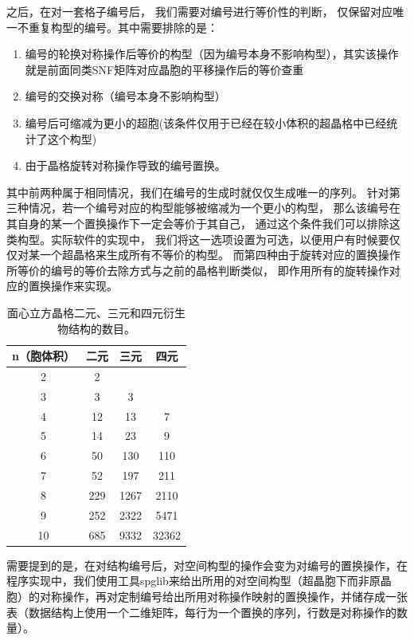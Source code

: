 之后，在对一套格子编号后，
我们需要对编号进行等价性的判断，
仅保留对应唯一不重复构型的编号。其中需要排除的是：
\begin{enumerate}
  \item 编号的轮换对称操作后等价的构型（因为编号本身不影响构型），其实该操作就是前面同类SNF矩阵对应晶胞的平移操作后的等价查重
  \item 编号的交换对称（编号本身不影响构型）
  \item 编号后可缩减为更小的超胞(该条件仅用于已经在较小体积的超晶格中已经统计了这个构型)
  \item 由于晶格旋转对称操作导致的编号置换。
\end{enumerate}
其中前两种属于相同情况，我们在编号的生成时就仅仅生成唯一的序列。
针对第三种情况，若一个编号对应的构型能够被缩减为一个更小的构型，
那么该编号在其自身的某一个置换操作下一定会等价于其自己，
通过这个条件我们可以排除这类构型。实际软件的实现中，
我们将这一选项设置为可选，以便用户有时候要仅仅对某一个超晶格来生成所有不等价的构型。
而第四种由于旋转对应的置换操作所等价的编号的等价去除方式与之前的晶格判断类似，
即作用所有的旋转操作对应的置换操作来实现。

\begin{table}[htb!]
  \centering
  \begin{tabular}{cccc}
    \hline\hline
    n（胞体积） & 二元 & 三元 & 四元 \\
    \hline
    2 & 2      &         &            \\
    3 & 3      &     3    &            \\
    4 & 12      &    13     &    7        \\
    5 & 14      &    23     &    9        \\
    6 & 50      &     130    &    110        \\
    7 & 52      &      197   &      211      \\
    8 & 229      &     1267    &      2110      \\
    9 & 252      &     2322    &       5471     \\
    10 & 685      &    9332     &      32362      \\
    \hline\hline
  \end{tabular}
  \caption{面心立方晶格二元、三元和四元衍生物结构的数目。}
  \label{table:derive_structures_num}
\end{table}

需要提到的是，在对结构编号后，对空间构型的操作会变为对编号的置换操作，在程序实现中，我们使用工具spglib\cite{togo2018texttt}来给出所用的对空间构型（超晶胞下而非原晶胞）的对称操作，再对定制编号给出所用对称操作映射的置换操作，并储存成一张表（数据结构上使用一个二维矩阵，每行为一个置换的序列，行数是对称操作的数量）。

